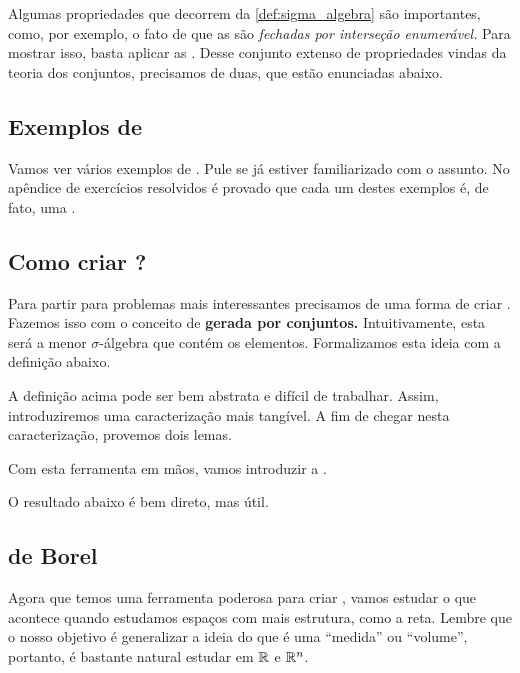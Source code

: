\sigmaAlgebra

Algumas propriedades que decorrem da \ref{def:sigma_algebra} são importantes, como, por exemplo, o fato de que as \sigmaAlgs são \textit{fechadas por interseção enumerável.} Para mostrar isso, basta aplicar as . Desse conjunto extenso de propriedades vindas da teoria dos conjuntos, precisamos de duas, que estão enunciadas abaixo.

\deMorgan

\subsection*{Exemplos de \sigmaAlgs}
Vamos ver vários exemplos de \sigmaAlgs. Pule se já estiver familiarizado com o assunto. No apêndice de exercícios resolvidos é provado que cada um destes exemplos é, de fato, uma \sigmaAlg.

\trivialSigmaAlgebra
\powerSetSigmaAlgebra
\countableSetsSigmaAlgebra

\subsection*{Como criar \sigmaAlgs?}
Para partir para problemas mais interessantes precisamos de uma forma de criar \sigmaAlgs. Fazemos isso com o conceito de \textbf{\sigmaAlg gerada por conjuntos.} Intuitivamente, esta será a menor $\sigma$-álgebra que contém os elementos. Formalizamos esta ideia com a definição abaixo.

\generatedSigmaAlgebra

A definição acima pode ser bem abstrata e difícil de trabalhar. Assim, introduziremos uma caracterização mais tangível. A fim de chegar nesta caracterização, provemos dois lemas.

\sigmaAlgebraIntersection
\generatedSigmaAlgebraIsUnique

Com esta ferramenta em mãos, vamos introduzir a .

\generatedSigmaAlgebraCharacterization

O resultado abaixo é bem direto, mas útil.

\sigmaAlgebraGeneratedBySubset

\subsection*{\sigmaAlgs de Borel}
Agora que temos uma ferramenta poderosa para criar \sigmaAlgs, vamos estudar o que acontece quando estudamos espaços com mais estrutura, como a reta. Lembre que o nosso objetivo é generalizar a ideia do que é uma ``medida'' ou ``volume'', portanto, é bastante natural estudar \sigmaAlgs em $\mathbb{R}$ e $\mathbb{R}^n$.

